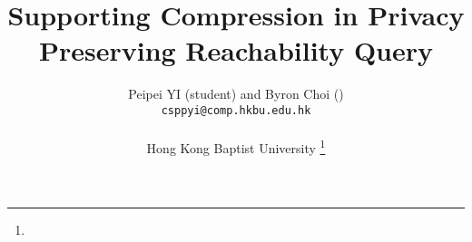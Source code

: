 \documentclass[10pt,conference,letterpaper]{IEEEtran}
\newcommand{\eat}[1]{}
\begin{document}
\title{Supporting Compression in Privacy Preserving Reachability Query}

\author{Peipei YI (student) and Byron Choi ()\\
{\tt csppyi@comp.hkbu.edu.hk}

\\
Hong Kong Baptist University
\thanks{}}
\IEEEcompsoctitleabstractindextext{}
%
\maketitle



\eat{









}
\end{document}
